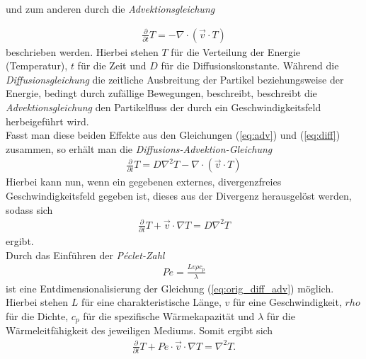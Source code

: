\documentclass[12pt,a4paper,titlepage,headinclude,bibtotoc]{scrartcl}
\begin{document}
und zum anderen durch die \textit{Advektionsgleichung}

\begin{align}
\label{eq:adv}
\frac{\partial}{\partial t}T = - \nabla \cdot (\vec{v}\cdot T)
\end{align}
beschrieben werden. Hierbei stehen $T$ für die Verteilung der Energie (Temperatur), $t$ für die Zeit und $D$ für die Diffusionskonstante.
Während die \textit{Diffusionsgleichung} die zeitliche Ausbreitung der Partikel beziehungsweise der Energie, bedingt durch zufällige Bewegungen, beschreibt, beschreibt die \textit{Advektionsgleichung} den Partikelfluss der durch ein Geschwindigkeitsfeld herbeigeführt wird.\\
Fasst man diese beiden Effekte aus den Gleichungen (\ref{eq:adv}) und (\ref{eq:diff}) zusammen, so erhält man die \textit{Diffusions-Advektion-Gleichung}
\begin{align*}
\frac{\partial}{\partial t}T = D \nabla^2 T - \nabla \cdot (\vec{v}\cdot T)
\end{align*}
Hierbei kann nun, wenn ein gegebenen externes, divergenzfreies Geschwindigkeitsfeld gegeben ist, dieses aus der Divergenz herausgelöst werden, sodass sich
\begin{align}
\label{eq:orig_diff_adv}
\frac{\partial}{\partial t} T + \vec{v} \cdot \nabla T = D \nabla^2 T
\end{align}
ergibt.\\
Durch das Einführen der \textit{Péclet-Zahl}
\begin{align*}
Pe = \frac{L v \rho c_p}{\lambda}
\end{align*}
ist eine Entdimensionalisierung der Gleichung (\ref{eq:orig_diff_adv}) möglich. Hierbei stehen $L$ für eine charakteristische Länge, $v$ für eine Geschwindigkeit, $rho$ für die Dichte, $c_p$ für die spezifische Wärmekapazität und $\lambda$ für die Wärmeleitfähigkeit des jeweiligen Mediums. Somit ergibt sich
\begin{align}
\label{eq:diff_adv}
\frac{\partial}{\partial t} T + Pe \cdot \vec{v} \cdot \nabla T = \nabla^2 T.
\end{align}
\end{document}

